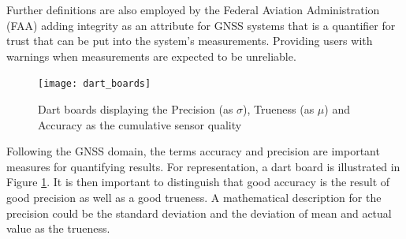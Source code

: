 Further definitions are also employed by the Federal Aviation Administration (FAA) adding integrity as an attribute for GNSS systems that is a quantifier for trust that can be put into the system's measurements. Providing users with warnings when measurements are expected to be unreliable. \cite[B.1.5, B.1.10]{federal_aviation_administration_federal_2008}

\begin{figure}[h]
    \centering
    \texttt{[image: dart\_boards]}
    \caption[Data Quality Dartboards]{Dart boards displaying the Precision (as $\sigma$), Trueness (as $\mu$) and Accuracy as the cumulative sensor quality \cite{iso_accuracy_1997}}
    \label{fig:dart_boards}
\end{figure}

Following the GNSS domain, the terms accuracy and precision are important measures for quantifying results. For representation, a dart board is illustrated in Figure \ref{fig:dart_boards}. It is then important to distinguish that good accuracy is the result of good precision as well as a good trueness. A mathematical description for the precision could be the standard deviation and the deviation of mean and actual value as the trueness. \cite{iso_accuracy_1997}\cite[S.33ff.]{smith_scientist_1999}




